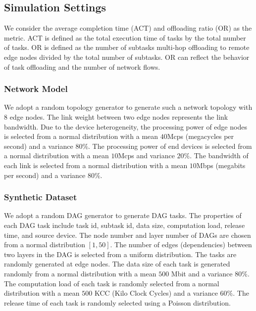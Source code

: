 \documentclass[10pt, conference, letterpaper]{IEEEtran}
\begin{document}
\subsection{Simulation Settings}

We consider the average completion time (ACT) and offloading ratio (OR) as the metric. ACT is defined as the total execution time of tasks by the total number of tasks. OR is defined as the number of subtasks multi-hop offloading to remote edge nodes divided by the total number of subtasks. OR can reflect the behavior of task offloading and the number of network flows.

\subsubsection{Network Model} We adopt a random topology generator \cite{TP-toolbox-web} to generate such a network topology with $8$ edge nodes. The link weight between two edge nodes represents the link bandwidth. Due to the device heterogeneity, the processing power of edge nodes is selected from a normal distribution with a mean $40$Mcps (megacycles per second) and a variance $80\%$. The processing power of end devices is selected from a normal distribution with a mean $10$Mcps and variance $20\%$. The bandwidth of each link is selected from a normal distribution with a mean $10$Mbps (megabits per second) and a variance $80\%$.

\subsubsection{Synthetic Dataset} We adopt a random DAG generator \cite{sahni2020multihop} to generate DAG tasks. The properties of each DAG task include task id, subtask id, data size, computation load, release time, and source device. The node number and layer number of DAGs are chosen from a normal distribution $[1, 50]$. The number of edges (dependencies) between two layers in the DAG is selected from a uniform distribution. The tasks are randomly generated at edge nodes. The data size of each task is generated randomly from a normal distribution with a mean $500$ Mbit and a variance $80\%$. The computation load of each task is randomly selected from a normal distribution with a mean $500$ KCC (Kilo Clock Cycles) and a variance $60\%$. The release time of each task is randomly selected using a Poisson distribution.

\end{document}
